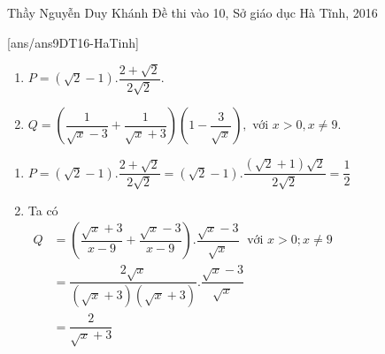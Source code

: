 \begin{name}
{Thầy Nguyễn Duy Khánh}
{Đề thi vào 10, Sở giáo dục Hà Tĩnh, 2016}
\end{name}
\setcounter{ex}{0}
[ans/ans9DT16-HaTinh]
\begin{ex}%
    \hfill
    \begin{enumerate}
        \item $P = \left(\sqrt{2}-1\right).\dfrac{2+\sqrt{2}}{2\sqrt{2}}.$
        \item $Q = \left(\dfrac{1}{\sqrt{x} - 3}+\dfrac{1}{\sqrt{x} + 3}\right)\left(1-\dfrac{3}{\sqrt{x}}\right),$\; với $x > 0, x\ne 9$.
    \end{enumerate}
\loigiai
    {
    \begin{enumerate}
        \item $P =  \left(\sqrt{2}-1\right).\dfrac{2+\sqrt{2}}{2\sqrt{2}} =  \left(\sqrt{2}-1\right).\dfrac{(\sqrt{2}+1)\sqrt{2}}{2\sqrt{2}} = \dfrac{1}{2}$
        \item Ta có \\
        $
        \begin{aligned}
       Q& = \left(\dfrac{\sqrt{x}+3}{x-9}+\dfrac{\sqrt{x}-3}{x-9}\right).\dfrac{\sqrt{x}-3}{\sqrt{x}}\; \mbox{ với } x > 0; x\ne 9\\
        &=\dfrac{2\sqrt{x}}{(\sqrt{x}+3)(\sqrt{x}+3)}.\dfrac{\sqrt{x}-3}{\sqrt{x}}\\
        &=\dfrac{2}{\sqrt{x}+3}
        \end{aligned}
        $
    \end{enumerate}
    }
\end{ex}

